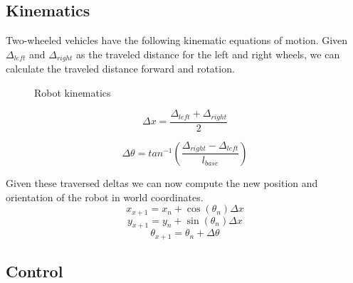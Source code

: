 \documentclass[a4paper]{article}
\begin{document}
\subsection{Kinematics}

Two-wheeled vehicles have the following kinematic equations of motion.
Given $\Delta_{left}$ and $\Delta_{right}$ as the traveled distance for the left and
right wheels, we can calculate the traveled distance forward and rotation.

\begin{figure}[h!]
 \centering
 \caption{Robot kinematics}
\end{figure}

\begin{equation}
\Delta x = \frac{\Delta_{left} + \Delta_{right}}{2}
\end{equation}

\begin{equation}
\Delta \theta = tan^{-1}(\frac{\Delta_{right} - \Delta_{left}}{l_{base}})
\end{equation}

Given these traversed deltas we can now compute the new position and orientation
of the robot in world coordinates.
\begin{equation}
 x_{x+1} = x_{n} + \cos(\theta_n) \Delta x
\end{equation}
\begin{equation}
 y_{x+1} = y_{n} + \sin(\theta_n) \Delta x
\end{equation}
\begin{equation}
 \theta_{x+1} = \theta_{n} + \Delta \theta
\end{equation}

\subsection{Control}
\end{document}
